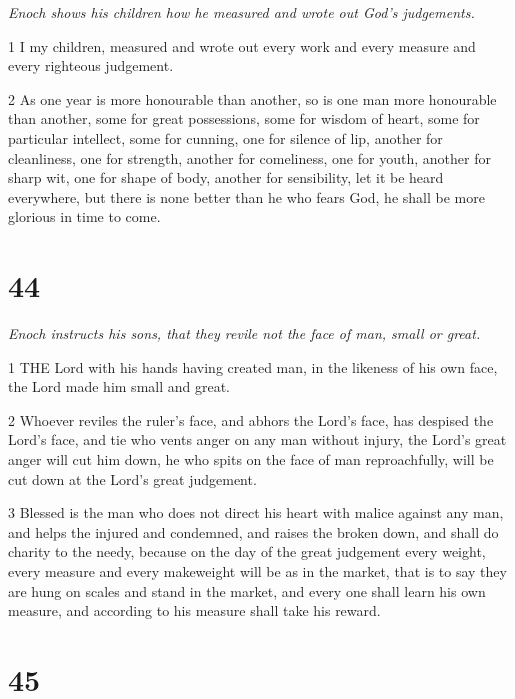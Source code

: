 \par \textit{Enoch shows his children how he measured and wrote out God's judgements.}

\par 1 I my children, measured and wrote out every work and every measure and every righteous judgement.

\par 2 As one year is more honourable than another, so is one man more honourable than another, some for great possessions, some for wisdom of heart, some for particular intellect, some for cunning, one for silence of lip, another for cleanliness, one for strength, another for comeliness, one for youth, another for sharp wit, one for shape of body, another for sensibility, let it be heard everywhere, but there is none better than he who fears God, he shall be more glorious in time to come.

\chapter{44}

\par \textit{Enoch instructs his sons, that they revile not the face of man, small or great.}

\par 1 THE Lord with his hands having created man, in the likeness of his own face, the Lord made him small and great.

\par 2 Whoever reviles the ruler's face, and abhors the Lord's face, has despised the Lord's face, and tie who vents anger on any man without injury, the Lord's great anger will cut him down, he who spits on the face of man reproachfully, will be cut down at the Lord's great judgement.

\par 3 Blessed is the man who does not direct his heart with malice against any man, and helps the injured and condemned, and raises the broken down, and shall do charity to the needy, because on the day of the great judgement every weight, every measure and every makeweight will be as in the market, that is to say they are hung on scales and stand in the market, and every one shall learn his own measure, and according to his measure shall take his reward.



\chapter{45}

